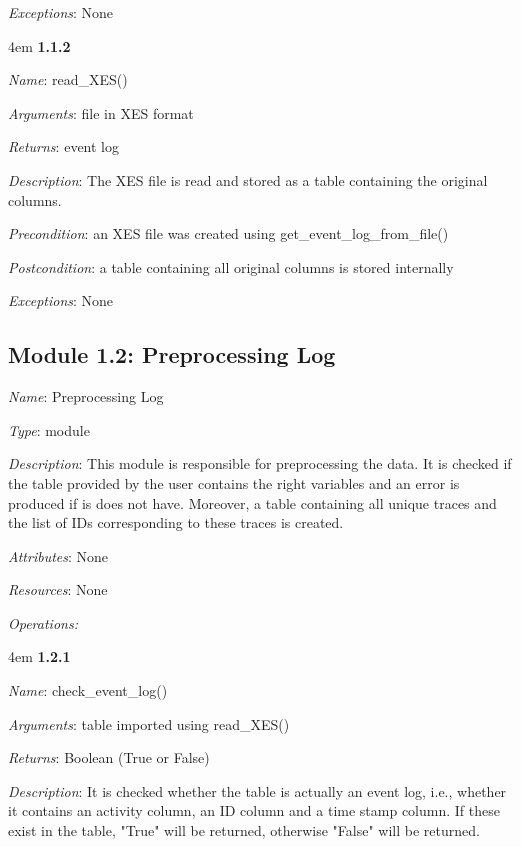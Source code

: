 \documentclass[notitlepage]{article}
\begin{document}
\begin{flushleft}
\textit{Exceptions}: None
\par
\endgroup

\medskip

\par
\begingroup
\leftskip4em
\textbf{1.1.2}

\textit{Name}: read\_XES()

\textit{Arguments}: file in XES format

\textit{Returns}: event log 

\textit{Description}: The XES file is read and stored as a table containing the original columns.

\textit{Precondition}: an XES file was created using get\_event\_log\_from\_file()

\textit{Postcondition}: a table containing all original columns is stored internally 

\textit{Exceptions}: None
\par
\endgroup

\medskip

\subsection{Module 1.2: Preprocessing Log}
\textit{Name}: Preprocessing Log

\textit{Type}: module

\textit{Description}: This module is responsible for preprocessing the data. It is checked if the table provided by the user contains the right variables and an error is produced if is does not have. Moreover, a table containing all unique traces and the list of IDs corresponding to these traces is created.

\textit{Attributes}: None

\textit{Resources}: None

\textit{Operations: }
\medskip


\par
\begingroup
\leftskip4em
\textbf{1.2.1} 

\textit{Name}: check\_event\_log()

\textit{Arguments}: table imported using read\_XES() 

\textit{Returns}: Boolean (True or False)

\textit{Description}: It is checked whether the table is actually an event log, i.e., whether it contains an activity column, an ID column and a time stamp column. If these exist in the table, "True" will be returned, otherwise "False" will be returned. 


\end{flushleft}
\end{document}
